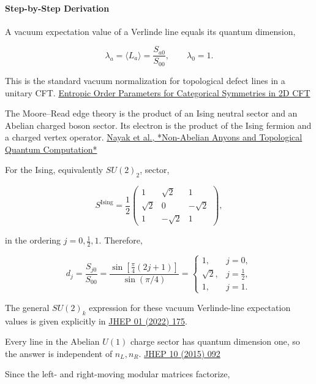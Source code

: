 \documentclass[11pt]{article}
\begin{document}
\paragraph*{Step-by-Step Derivation}

A vacuum expectation value of a Verlinde line equals its quantum dimension,

\[
\lambda_a=\langle L_a\rangle
=\frac{S_{a0}}{S_{00}},
\qquad
\lambda_0=1.
\]

This is the standard vacuum normalization for topological defect lines in a unitary CFT. \href{\detokenize{https://www.mdpi.com/1099-4300/26/12/1064}}{Entropic Order Parameters for Categorical Symmetries in 2D CFT}

The Moore--Read edge theory is the product of an Ising neutral sector and an Abelian charged boson sector. Its electron is the product of the Ising fermion and a charged vertex operator. \href{\detokenize{https://harvest.aps.org/v2/journals/articles/10.1103/RevModPhys.80.1083/fulltext}}{Nayak et al., *Non-Abelian Anyons and Topological Quantum Computation*}

For the Ising, equivalently $SU(2)_2$, sector,

\[
S^{\mathrm{Ising}}
=
\frac12
\begin{pmatrix}
1&\sqrt2&1\\
\sqrt2&0&-\sqrt2\\
1&-\sqrt2&1
\end{pmatrix},
\]

in the ordering $j=0,\frac12,1$. Therefore,

\[
d_j=\frac{S_{j0}}{S_{00}}
=
\frac{\sin\!\left[\frac{\pi}{4}(2j+1)\right]}
{\sin(\pi/4)}
=
\begin{cases}
1,&j=0,\\[2mm]
\sqrt2,&j=\frac12,\\[2mm]
1,&j=1.
\end{cases}
\]

The general $SU(2)_k$ expression for these vacuum Verlinde-line expectation values is given explicitly in \href{\detokenize{https://scoap3-prod-backend.s3.cern.ch/media/files/67899/10.1007/JHEP01%282022%29175_a.pdf}}{JHEP 01 (2022) 175}.

Every line in the Abelian $U(1)$ charge sector has quantum dimension one, so the answer is independent of $n_L,n_R$. \href{\detokenize{https://s3.cern.ch/inspire-prod-files-e/e3ba3709c35f55bab8ac4ed87349533e}}{JHEP 10 (2015) 092}

Since the left- and right-moving modular matrices factorize,
\end{document}

